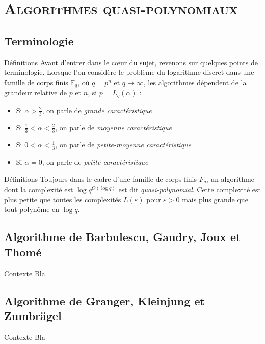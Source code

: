\documentclass[xcolor=x11names,compress]{beamer}
\theoremstyle{break}
\theoremstyle{sc}
\theoremstyle{definition}
\theoremstyle{remark}
\begin{document}
\section{\scshape Algorithmes quasi-polynomiaux}
\subsection{Terminologie}
\begin{frame}{Définitions}
  Avant d'entrer dans le cœur du sujet, revenons sur quelques points de
  terminologie. Lorsque l'on considère le problème du logarithme discret dans
  une famille de corps finis $\mathbb{F}_{q}$, où $q=p^n$ et $q\to\infty$, les
  algorithmes dépendent de la grandeur relative de $p$ et $n$, si
  $p=L_q(\alpha)$ :
  \begin{itemize}
    \item Si $\alpha>\frac{2}{3}$, on parle de \emph{grande caractéristique}
    \item Si $\frac{1}{3} <\alpha<\frac{2}{3}$, on parle de \emph{moyenne caractéristique}
    \item Si $0 <\alpha<\frac{1}{3}$, on parle de \emph{petite-moyenne caractéristique}
    \item Si $\alpha = 0$, on parle de \emph{petite caractéristique}
  \end{itemize}
\end{frame}


\begin{frame}{Définitions}
 Toujours dans le cadre d'une famille de corps finis $F_q$, un algorithme dont
 la complexité est  $\log q^{O(\log q)}$ est dit \emph{quasi-polynomial}. Cette
 complexité est plus petite que toutes les complexités $L(\varepsilon)$ pour
 $\varepsilon>0$ mais plus grande que tout polynôme en $\log q$.
\end{frame}

\subsection{Algorithme de Barbulescu, Gaudry, Joux et Thomé}

\begin{frame}{Contexte}
 Bla 
\end{frame}

\subsection{Algorithme de Granger, Kleinjung et Zumbrägel}

\begin{frame}{Contexte}
 Bla 
\end{frame}


\end{document}
